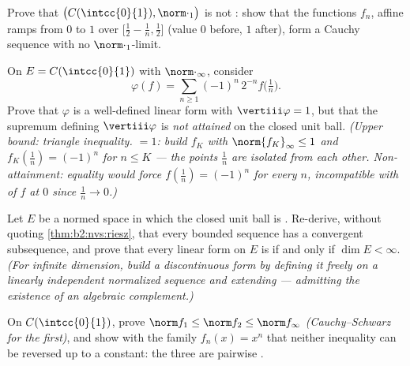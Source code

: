 \begin{exercise}[$\star\star$]\label{exo:b2:nvs:7}
Prove that $\bigl(C(\intcc{0}{1}), \norm\cdot_1\bigr)$ is not
: show that the functions $f_n$, affine ramps from $0$ to
$1$ over $\bigl[\frac12 - \frac1n, \frac12\bigr]$ (value $0$
before, $1$ after), form a Cauchy sequence with no 
$\norm\cdot_1$-limit.
\end{exercise}

\begin{exercise}[$\star\star\star$]\label{exo:b2:nvs:8}
On $E = C(\intcc{0}{1})$ with $\norm\cdot_\infty$, consider
\[
\varphi(f) = \sum_{n \geq 1} (-1)^n\, 2^{-n} f\bigl(\tfrac1n\bigr).
\]
Prove that $\varphi$ is a well-defined  linear form with
$\vertiii\varphi = 1$, but that the supremum defining
$\vertiii\varphi$ is \emph{not attained} on the closed unit ball.
\emph{(Upper bound: triangle inequality.  $= 1$: build
 $f_K$ with $\norm{f_K}_\infty \leq 1$ and $f_K(\frac1n)
= (-1)^n$ for $n \leq K$ --- the points $\frac1n$ are isolated from
each other. Non-attainment: equality would force $f(\frac1n) =
(-1)^n$ for every $n$, incompatible with  of $f$ at $0$
since $\frac1n \to 0$.)}
\end{exercise}

\begin{exercise}[$\star\star\star$]\label{exo:b2:nvs:9}
Let $E$ be a normed space in which the closed unit ball is .
Re-derive, without quoting \cref{thm:b2:nvs:riesz}, that every
bounded sequence has a convergent subsequence, and prove that every
linear form on $E$ is  if and only if $\dim E < \infty$.
\emph{(For infinite dimension, build a discontinuous form by
defining it freely on a linearly independent normalized sequence
and extending --- admitting the existence of an algebraic
complement.)}
\end{exercise}

\begin{exercise}[$\star\star$]\label{exo:b2:nvs:10}
On $C(\intcc{0}{1})$, prove $\norm f_1 \leq \norm f_2 \leq \norm
f_\infty$ \emph{(Cauchy--Schwarz for the first)}, and show with
the family $f_n(x) = x^n$ that neither inequality can be reversed
up to a constant: the three  are pairwise .
\end{exercise}

